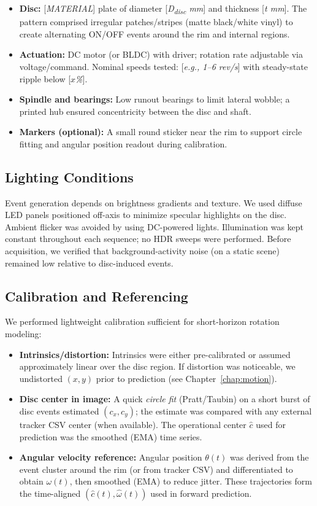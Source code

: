 \begin{itemize}
  \item \textbf{Disc:} [\textit{MATERIAL}] plate of diameter [\textit{D\textsubscript{disc} mm}] and thickness [\textit{t mm}]. The pattern comprised irregular patches/stripes (matte black/white vinyl) to create alternating ON/OFF events around the rim and internal regions.
  \item \textbf{Actuation:} DC motor (or BLDC) with driver; rotation rate adjustable via voltage/command. Nominal speeds tested: [\textit{e.g., 1--6 rev/s}] with steady-state ripple below [\textit{$x$\%}].
  \item \textbf{Spindle and bearings:} Low runout bearings to limit lateral wobble; a printed hub ensured concentricity between the disc and shaft.
  \item \textbf{Markers (optional):} A small round sticker near the rim to support circle fitting and angular position readout during calibration.
\end{itemize}

\subsection{Lighting Conditions}
Event generation depends on brightness gradients and texture. We used diffuse LED panels positioned off-axis to minimize specular highlights on the disc. Ambient flicker was avoided by using DC-powered lights. Illumination was kept constant throughout each sequence; no HDR sweeps were performed. Before acquisition, we verified that background-activity noise (on a static scene) remained low relative to disc-induced events.

\subsection{Calibration and Referencing}
We performed lightweight calibration sufficient for short-horizon rotation modeling:

\begin{itemize}
  \item \textbf{Intrinsics/distortion:} Intrinsics were either pre-calibrated or assumed approximately linear over the disc region. If distortion was noticeable, we undistorted $(x,y)$ prior to prediction (see Chapter~\ref{chap:motion}).
  \item \textbf{Disc center in image:} A quick \emph{circle fit} (Pratt/Taubin) on a short burst of disc events estimated $(c_x,c_y)$; the estimate was compared with any external tracker CSV center (when available). The operational center $\hat c$ used for prediction was the smoothed (EMA) time series.
  \item \textbf{Angular velocity reference:} Angular position $\theta(t)$ was derived from the event cluster around the rim (or from tracker CSV) and differentiated to obtain $\omega(t)$, then smoothed (EMA) to reduce jitter. These trajectories form the time-aligned $(\hat c(t),\hat\omega(t))$ used in forward prediction.
\end{itemize}

